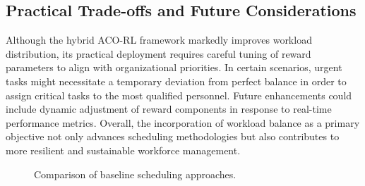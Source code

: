 \documentclass[%
aip,
cp,  %
amsmath,amssymb,
reprint,%
]{revtex4-2}
\begin{document}
	\subsection{\label{subsec:tradeoffs}Practical Trade-offs and Future Considerations}
	Although the hybrid ACO-RL framework markedly improves workload distribution,
	its practical deployment requires careful tuning of reward parameters to align
	with organizational priorities. In certain scenarios, urgent tasks might
	necessitate a temporary deviation from perfect balance in order to assign
	critical tasks to the most qualified personnel. Future enhancements could include
	dynamic adjustment of reward components in response to real-time performance metrics.
	Overall, the incorporation of workload balance as a primary objective not only
	advances scheduling methodologies but also contributes to more resilient and sustainable
	workforce management.
	
	\begin{figure}
		\centering
		\hfill
		\hfill
		\caption{\label{fig:baseline}Comparison of baseline scheduling approaches.}
	\end{figure}
	
\end{document}
